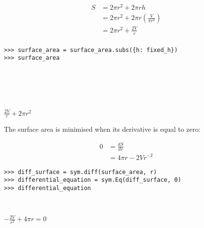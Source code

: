 \documentclass[12pt]{article}
\begin{document}
\begin{minipage}[t]{.37\textwidth} %
\begin{mdframed}[linewidth=0.5mm, backgroundcolor=cyan!10]
\begin{align*}
S &= 2\pi r^2 + 2 \pi rh \\
&= 2\pi r^2 + 2 \pi r\left(\frac{V}{\pi r^2}\right) \\
&= 2\pi r^2 + \frac{2 V}{r} \\
\end{align*}
\end{mdframed}
\end{minipage} %
\begin{minipage}[t]{.63\textwidth} %
\begin{verbatim}
>>> surface_area = surface_area.subs({h: fixed_h})
>>> surface_area






\end{verbatim}
\vspace{-3.5cm}

\hspace{0.5cm}\begin{minipage}{3cm}$\displaystyle{\frac{2V}{r} + 2\pi r^2}$\end{minipage}
\end{minipage}
\vspace{0.5cm}

\begin{mdframed}[linewidth=0.5mm, backgroundcolor=orange!10]
The surface area is minimised when its derivative is equal to zero:
\end{mdframed}

\begin{minipage}[t]{.37\textwidth} %
\begin{mdframed}[linewidth=0.5mm, backgroundcolor=cyan!10]
\begin{align*}
0 &= \frac{dS}{dr} \\
&= 4\pi r - 2Vr^{-2}
\end{align*}
\vspace{1mm}
\end{mdframed}
\end{minipage} %
\begin{minipage}[t]{.63\textwidth} %
\begin{verbatim}
>>> diff_surface = sym.diff(surface_area, r)
>>> differential_equation = sym.Eq(diff_surface, 0)
>>> differential_equation



\end{verbatim}
\vspace{-2cm}

\hspace{0.5cm}\begin{minipage}{3cm}$\displaystyle{-\frac{2V}{r^2} + 4\pi r = 0}$\end{minipage}
\end{minipage}
\vspace{0.5cm}
\end{document}
